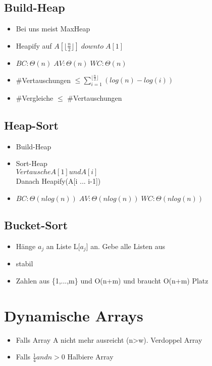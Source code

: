 \documentclass{article}
\begin{document}
\subsection{Build-Heap}
\begin{itemize}
\item Bei uns meist MaxHeap
\item Heapify auf $A[\lfloor \frac{n}{2} \rfloor] \; downto  \;A[1]$
\item $BC: \Theta(n)\; AV:\Theta(n)\; WC: \Theta(n)\;$
\item \#Vertauschungen $\leq \sum_{i=1}^{\lfloor \frac{n}{2} \rfloor} (log(n) -log(i))$
\item \#Vergleiche $\leq$ \#Vertauschungen
\end{itemize}

\subsection{Heap-Sort}
\begin{itemize}
\item Build-Heap
\item Sort-Heap \\
$Vertausche A[1] und A[i]$\\
Danach Heapify(A[i ... i-1])\\
\item $BC: \Theta(nlog(n))\; AV:\Theta(nlog(n))\; WC: \Theta(nlog(n))\;$
\end{itemize}

\subsection{Bucket-Sort}
\begin{itemize}
\item Hänge $a_j$ an Liste L[$a_j$] an. Gebe alle Listen aus
\item stabil
\item Zahlen aus \{1,...,m\} und O(n+m) und braucht O(n+m) Platz
\end{itemize}

\section{Dynamische Arrays}
\begin{itemize}
\item Falls Array A nicht mehr ausreicht (n>w). Verdoppel Array 
\item Falls $\frac{1}{4} and n>0$ Halbiere Array
\end{itemize}
\end{document}
